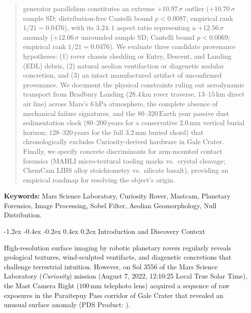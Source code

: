 \documentclass[11pt,a4paper]{article}
\makeatletter
\renewcommand\section{\@startsection {section}{1}{\z@}%
                                   {-1.2ex \@plus -0.4ex \@minus -0.2ex}%
                                   {0.4ex \@plus 0.2ex}%
                                   {\normalfont\large\bfseries}}
\makeatother
\begin{document}
\begin{abstract}
generator parallelism constitutes an extreme $+10.97\,\sigma$ outlier ($+10.70\,\sigma$ sample SD; distribution-free Cantelli bound $p < 0.0087$; empirical rank $1/21 = 0.0476$), with its $3.24:1$ aspect ratio representing a $+12.56\,\sigma$ anomaly ($+12.06\,\sigma$ unrounded sample SD; Cantelli bound $p < 0.0069$; empirical rank $1/21 = 0.0476$). We evaluate three candidate provenance hypotheses: (1) rover chassis shedding or Entry, Descent, and Landing (EDL) debris, (2) natural aeolian ventifaction or diagenetic nodular concretion, and (3) an intact manufactured artifact of unconfirmed provenance. We document the physical constraints ruling out aerodynamic transport from Bradbury Landing ($28.4\,\text{km}$ rover traverse, $13\text{--}15\,\text{km}$ direct air line) across Mars's $6\,\text{hPa}$ atmosphere, the complete absence of mechanical failure signatures, and the $80\text{--}320\,\text{Earth year}$ passive dust sedimentation clock ($80\text{--}200\,\text{years}$ for a conservative $2.0\,\text{mm}$ vertical burial horizon; $128\text{--}320\,\text{years}$ for the full $3.2\,\text{mm}$ buried chord) that chronologically excludes Curiosity-derived hardware in Gale Crater. Finally, we specify concrete discriminants for arm-mounted contact forensics (MAHLI micro-textural tooling marks vs.\ crystal cleavage; ChemCam LIBS alloy stoichiometry vs.\ silicate basalt), providing an empirical roadmap for resolving the object's origin.
\end{abstract}

\vspace{0.8em}
\noindent\textbf{Keywords:} Mars Science Laboratory, Curiosity Rover, Mastcam, Planetary Forensics, Image Processing, Sobel Filter, Aeolian Geomorphology, Null Distribution.

\vspace{1.0em}

\section{Introduction and Discovery Context}

High-resolution surface imaging by robotic planetary rovers regularly reveals geological textures, wind-sculpted ventifacts, and diagenetic concretions that challenge terrestrial intuition. However, on Sol 3556 of the Mars Science Laboratory (\textit{Curiosity}) mission (August 7, 2022, 12:10:25 Local True Solar Time), the Mast Camera Right ($100\,\text{mm}$ telephoto lens) acquired a sequence of raw exposures in the Paraitepuy Pass corridor of Gale Crater that revealed an unusual surface anomaly (PDS Product: ).
\end{document}

